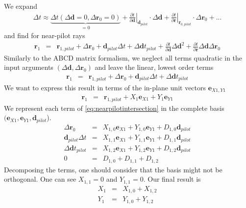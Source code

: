 \documentclass[12pt,a4paper,twoside,openright,BCOR10mm,headsepline,titlepage,abstracton,chapterprefix,final]{scrreprt}
\newcommand\Vector[1]{{\mathbf{#1}}}
\begin{document}
We expand
\begin{eqnarray}
 \Delta t \approx 
    \underbrace{
      \Delta t(\Delta\Vector{d} = 0, \Delta\Vector{r}_0 = 0)
    }_{=0}
    + \left. \frac{\partial t}{\partial\Vector{d}} \right|_{\Vector{d}_{pilot}}  \cdot \Delta\Vector{d} 
    + \left. \frac{\partial t}{\partial\Vector{r}} \right|_{\Vector{r}_{0,pilot}} \cdot \Delta\Vector{r}_0 
    + ...
    \label{eq:delta_t}
\end{eqnarray}
and find for near-pilot rays
\begin{eqnarray}
 \Vector{r}_1 &=& \Vector{r}_{1,pilot} + \Delta\Vector{r}_0 + \Vector{d}_{pilot}\Delta t + \Delta\Vector{d}t_{pilot} 
      + \frac{\partial t}{\partial\Vector{d}} \Delta\Vector{d}^2 
      + \frac{\partial t}{\partial\Vector{r}} \Delta\Vector{d} \Delta\Vector{r}_0 
\end{eqnarray} 
Similarly to the ABCD matrix formalism, we neglect all terms quadratic in the input arguments $(\Delta\Vector{d}, \Delta\Vector{r}_0)$
and leave the linear, lowest order terms
\begin{eqnarray}
 \Vector{r}_1 &=& \Vector{r}_{1,pilot} + \Delta\Vector{r}_0 + \Vector{d}_{pilot}\Delta t + \Delta\Vector{d}t_{pilot}
 \label{eq:nearpilotintersection}
\end{eqnarray} 
We want to express this result in terms of the in-plane unit vectors $\Vector{e}_{X1,Y1}$
\begin{eqnarray}
 \Vector{r}_1 &=& \Vector{r}_{1,pilot} + X_1 \Vector{e}_{X1} + Y_1 \Vector{e}_{Y1}
\end{eqnarray} 
We represent each term of \ref{eq:nearpilotintersection} in the complete basis $(\Vector{e}_{X1}, \Vector{e}_{Y1}, \Vector{d}_{pilot}$).
\begin{eqnarray}
 \Delta\Vector{r}_0 &=& X_{1,0} \Vector{e}_{X1} + Y_{1,0} \Vector{e}_{Y1} + D_{1,0} \Vector{d}_{pilot} \\
 \Vector{d}_{pilot}\Delta t &=& X_{1,1} \Vector{e}_{X1} + Y_{1,1} \Vector{e}_{Y1} + D_{1,1} \Vector{d}_{pilot} \\
 \Delta\Vector{d}t_{pilot} &=& X_{1,2} \Vector{e}_{X1} + Y_{1,2} \Vector{e}_{Y1} + D_{1,2} \Vector{d}_{pilot} \\
 0 &=& D_{1,0} + D_{1,1} + D_{1,2}
\end{eqnarray}
Decomposing the terms, one should consider that the basis might not be orthogonal.
One can see $X_{1,1} = 0$ and $Y_{1,1}=0$.
Our final result is
\begin{eqnarray}
 X_1 &=& X_{1,0} + X_{1,2} \\
 Y_1 &=& Y_{1,0} + Y_{1,2}
\end{eqnarray}
\end{document}
